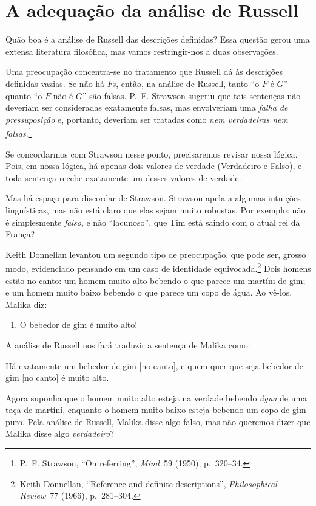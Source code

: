 \section{A adequação da análise de Russell}
Quão boa é a análise de Russell das descrições definidas? Essa questão gerou uma extensa literatura filosófica, mas vamos restringir-nos a duas observações.

Uma preocupação concentra-se no tratamento que Russell dá às descrições definidas vazias. Se não há $F$s, então, na análise de Russell, tanto \textquotedblleft o $F$ é $G$\textquotedblright{} quanto \textquotedblleft o $F$ não é $G$\textquotedblright{} são falsas. P.~F. Strawson sugeriu que tais sentenças não deveriam ser consideradas exatamente falsas, mas envolveriam uma \emph{falha de pressuposição} e, portanto, deveriam ser tratadas como \emph{nem verdadeiras nem falsas}.\footnote{P.~F. Strawson, \textquotedblleft On referring\textquotedblright{}, \textit{Mind}~59 (1950), p.~320--34.}







Se concordarmos com Strawson nesse ponto, precisaremos revisar nossa lógica. Pois, em nossa lógica, há apenas dois valores de verdade (Verdadeiro e Falso), e toda sentença recebe exatamente um desses valores de verdade.

Mas há espaço para discordar de Strawson. Strawson apela a algumas intuições linguísticas, mas não está claro que elas sejam muito robustas. Por exemplo: não é simplesmente \emph{falso}, e não \textquotedblleft lacunoso\textquotedblright{}, que Tim está saindo com o atual rei da França?

Keith Donnellan levantou um segundo tipo de preocupação, que pode ser, grosso modo, evidenciado pensando em um caso de identidade equivocada.\footnote{Keith Donnellan, \textquotedblleft Reference and definite descriptions\textquotedblright{}, \textit{Philosophical Review}~77 (1966), p.~281--304.} Dois homens estão no canto: um homem muito alto bebendo o que parece um martíni de gim; e um homem muito baixo bebendo o que parece um copo de água. Ao vê-los, Malika diz:






	\begin{enumerate}
\item\label{gindrinker} O bebedor de gim é muito alto!
	\end{enumerate}
A análise de Russell nos fará traduzir a sentença de Malika como:
	\begin{compactlist}
\item[\ref*{gindrinker}$'$.] Há exatamente um bebedor de gim [no canto], e quem quer que seja bebedor de gim [no canto] é muito alto.
	\end{compactlist}
Agora suponha que o homem muito alto esteja na verdade bebendo \emph{água} de uma taça de martíni, enquanto o homem muito baixo esteja bebendo um copo de gim puro. Pela análise de Russell, Malika disse algo falso, mas não queremos dizer que Malika disse algo \emph{verdadeiro}?

